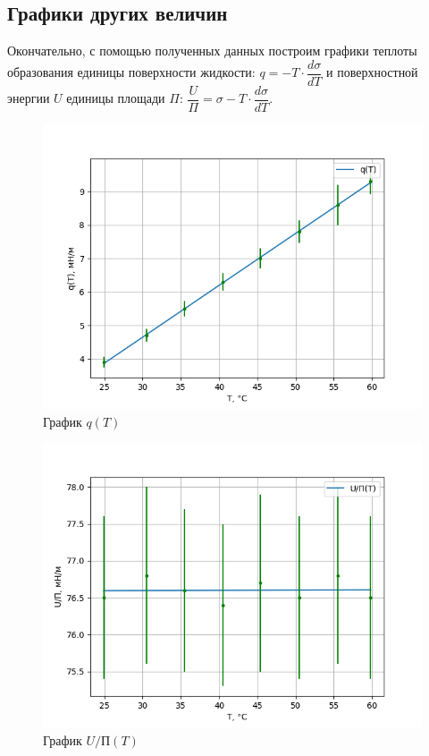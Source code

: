 \documentclass[a4paper,12pt]{article}
\theoremstyle{definition}
\begin{document}
	\subsection{Графики других величин}
	Окончательно, с помощью полученных данных построим графики теплоты образования единицы поверхности жидкости: $q = - T\cdot\dfrac{d\sigma}{dT}$ и поверхностной энергии $U$ единицы площади $\Pi$: $\dfrac{U}{\Pi} = \sigma - T\cdot\dfrac{d\sigma}{dT}$.
 \newpage
    \begin{figure}[h!]
            \centering
            \includegraphics[scale=0.9]{qt.png}
            \caption{График $q(T)$}
            \label{graph}
    \end{figure}
    \begin{figure}[h!]
            \centering
            \includegraphics[scale=0.9]{ut.png}
            \caption{График $U/П(T)$}
            \label{graph}
    \end{figure}
\end{document}

